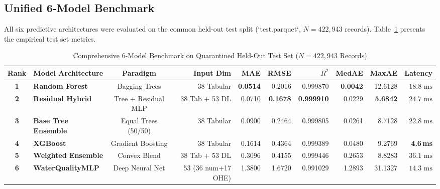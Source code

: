 \documentclass[conference]{IEEEtran}
\begin{document}
\subsection{Unified 6-Model Benchmark}
All six predictive architectures were evaluated on the common held-out test split
(`test.parquet`, $N = 422,943$ records). Table~\ref{tab:master_benchmark} presents
the empirical test set metrics.

\begin{table}[!t]
  \caption{Comprehensive 6-Model Benchmark on Quarantined Held-Out Test Set ($N = 422,943$ Records)}
  \label{tab:master_benchmark}
  \centering
  \setlength{\tabcolsep}{4.5pt}
  \begin{tabular}{clcrrrrrrr}
    \toprule
    \textbf{Rank} & \textbf{Model Architecture} & \textbf{Paradigm} & \textbf{Input Dim}
      & \textbf{MAE} & \textbf{RMSE} & \textbf{$R^2$} & \textbf{MedAE} & \textbf{MaxAE} & \textbf{Latency} \\
    \midrule
    \textbf{1} & \textbf{Random Forest}      & Bagging Trees       & 38 Tabular          & \textbf{0.0514} & 0.2016          & 0.999870          & \textbf{0.0042} & 12.6128          & $18.8\text{ ms}$ \\
    \textbf{2} & \textbf{Residual Hybrid}    & Tree + Residual MLP & 38 Tab + 53 DL      & 0.0710          & \textbf{0.1678} & \textbf{0.999910} & 0.0229          & \textbf{5.6842}  & $24.7\text{ ms}$ \\
    \textbf{3} & \textbf{Base Tree Ensemble} & Equal Trees (50/50) & 38 Tabular          & 0.0900          & 0.2464          & 0.999805          & 0.0261          & 8.7128           & $22.8\text{ ms}$ \\
    \textbf{4} & \textbf{XGBoost}            & Gradient Boosting   & 38 Tabular          & 0.1614          & 0.4364          & 0.999389          & 0.0480          & 9.2769           & \textbf{4.6\,ms} \\
    \textbf{5} & \textbf{Weighted Ensemble}  & Convex Blend        & 38 Tab + 53 DL      & 0.3096          & 0.4155          & 0.999446          & 0.2653          & 8.8283           & $36.1\text{ ms}$ \\
    \textbf{6} & \textbf{WaterQualityMLP}    & Deep Neural Net     & 53 (36 num+17 OHE)  & 1.3800          & 1.6720          & 0.991029          & 1.2893          & 31.1327          & $14.3\text{ ms}$ \\
    \bottomrule
  \end{tabular}
\end{table}
\end{document}
